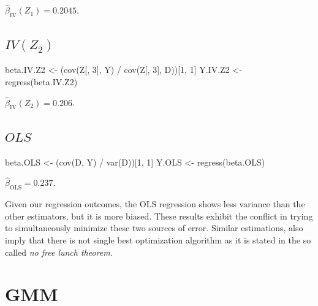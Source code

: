 \documentclass[9pt,twocolumn,twoside,]{pnas-new}
\newenvironment{Shaded}{}{}
\newcommand{\DecValTok}[1]{\textcolor[rgb]{0.25,0.63,0.44}{#1}}
\newcommand{\FunctionTok}[1]{\textcolor[rgb]{0.02,0.16,0.49}{#1}}
\newcommand{\NormalTok}[1]{#1}
\newcommand{\OtherTok}[1]{\textcolor[rgb]{0.00,0.44,0.13}{#1}}
\newcommand{\SpecialCharTok}[1]{\textcolor[rgb]{0.25,0.44,0.63}{#1}}
\begin{document}
\(\hat{\beta}_{\text{IV}} (Z_1) = 0.2045\).

\hypertarget{ivz_2}{%
\subsection{\texorpdfstring{\(IV(Z_2)\)}{IV(Z\_2)}}\label{ivz_2}}

\begin{Shaded}
\begin{Highlighting}[]
\NormalTok{beta.IV.Z2 }\OtherTok{\textless{}{-}}\NormalTok{ (}\FunctionTok{cov}\NormalTok{(Z[, }\DecValTok{3}\NormalTok{], Y) }\SpecialCharTok{/} \FunctionTok{cov}\NormalTok{(Z[, }\DecValTok{3}\NormalTok{], D))[}\DecValTok{1}\NormalTok{, }\DecValTok{1}\NormalTok{]}
\NormalTok{Y.IV.Z2 }\OtherTok{\textless{}{-}} \FunctionTok{regress}\NormalTok{(beta.IV.Z2)}
\end{Highlighting}
\end{Shaded}

\(\hat{\beta}_{\text{IV}} (Z_2) = 0.206\).

\hypertarget{ols}{%
\subsection{\texorpdfstring{\(OLS\)}{OLS}}\label{ols}}

\begin{Shaded}
\begin{Highlighting}[]
\NormalTok{beta.OLS }\OtherTok{\textless{}{-}}\NormalTok{ (}\FunctionTok{cov}\NormalTok{(D, Y) }\SpecialCharTok{/} \FunctionTok{var}\NormalTok{(D))[}\DecValTok{1}\NormalTok{, }\DecValTok{1}\NormalTok{]}
\NormalTok{Y.OLS }\OtherTok{\textless{}{-}} \FunctionTok{regress}\NormalTok{(beta.OLS)}
\end{Highlighting}
\end{Shaded}

\(\hat{\beta}_{\text{OLS}} = 0.237\).

\vspace*{20px}

Given our regression outcomes, the OLS regression shows less variance
than the other estimators, but it is more biased. These results exhibit
the conflict in trying to simultaneously minimize these two sources of
error. Similar estimations, also imply that there is not single best
optimization algorithm as it is stated in the so called \emph{no free
lunch theorem}.

\hypertarget{gmm}{%
\section{GMM}\label{gmm}}
\end{document}
